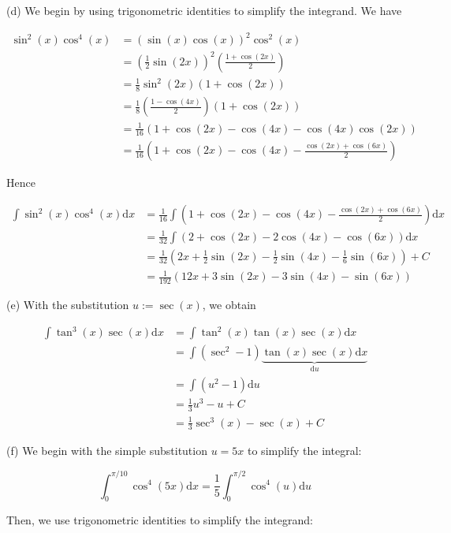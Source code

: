 \documentclass[10pt]{article}
\begin{document}
(d) We begin by using trigonometric identities to simplify the integrand. We have

$$
\begin{aligned}
\sin ^{2}(x) \cos ^{4}(x) & =(\sin (x) \cos (x))^{2} \cos ^{2}(x) \\
& =\left(\frac{1}{2} \sin (2 x)\right)^{2}\left(\frac{1+\cos (2 x)}{2}\right) \\
& =\frac{1}{8} \sin ^{2}(2 x)(1+\cos (2 x)) \\
& =\frac{1}{8}\left(\frac{1-\cos (4 x)}{2}\right)(1+\cos (2 x)) \\
& =\frac{1}{16}(1+\cos (2 x)-\cos (4 x)-\cos (4 x) \cos (2 x)) \\
& =\frac{1}{16}\left(1+\cos (2 x)-\cos (4 x)-\frac{\cos (2 x)+\cos (6 x)}{2}\right)
\end{aligned}
$$

Hence

$$
\begin{aligned}
\int \sin ^{2}(x) \cos ^{4}(x) \mathrm{d} x & =\frac{1}{16} \int\left(1+\cos (2 x)-\cos (4 x)-\frac{\cos (2 x)+\cos (6 x)}{2}\right) \mathrm{d} x \\
& =\frac{1}{32} \int(2+\cos (2 x)-2 \cos (4 x)-\cos (6 x)) \mathrm{d} x \\
& =\frac{1}{32}\left(2 x+\frac{1}{2} \sin (2 x)-\frac{1}{2} \sin (4 x)-\frac{1}{6} \sin (6 x)\right)+C \\
& =\frac{1}{192}(12 x+3 \sin (2 x)-3 \sin (4 x)-\sin (6 x))
\end{aligned}
$$

(e) With the substitution $u:=\sec (x)$, we obtain

$$
\begin{aligned}
\int \tan ^{3}(x) \sec (x) \mathrm{d} x & =\int \tan ^{2}(x) \tan (x) \sec (x) \mathrm{d} x \\
& =\int\left(\sec ^{2}-1\right) \underbrace{\tan (x) \sec (x) \mathrm{d} x}_{\mathrm{d} u} \\
& =\int\left(u^{2}-1\right) \mathrm{d} u \\
& =\frac{1}{3} u^{3}-u+C \\
& =\frac{1}{3} \sec ^{3}(x)-\sec (x)+C
\end{aligned}
$$

(f) We begin with the simple substitution $u=5 x$ to simplify the integral:

$$
\int_{0}^{\pi / 10} \cos ^{4}(5 x) \mathrm{d} x=\frac{1}{5} \int_{0}^{\pi / 2} \cos ^{4}(u) \mathrm{d} u
$$

Then, we use trigonometric identities to simplify the integrand:
\end{document}

